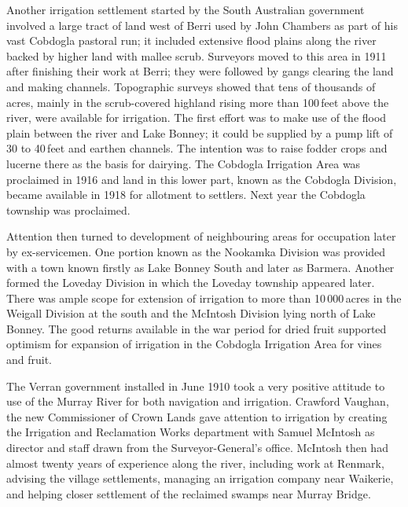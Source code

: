 Another irrigation settlement started by the South Australian
government involved a large tract of land west of Berri used by John
Chambers  as part of his vast Cobdogla
 pastoral run; it included extensive flood plains
along the river backed by higher land with mallee scrub.  Surveyors
moved to this area in 1911 after finishing their work at Berri; they
were followed by gangs clearing the land and making channels.
Topographic surveys showed that tens of thousands of acres, mainly in
the scrub-covered highland rising more than 100\,feet above the river,
were available for irrigation.  The first effort was to make use of
the flood plain between the river and Lake Bonney; it could be
supplied by a pump lift of 30 to 40\,feet and earthen channels. The
intention was to raise fodder crops and lucerne there as the basis for
dairying.  The Cobdogla Irrigation Area
 was proclaimed in 1916 and land in
this lower part, known as the Cobdogla Division, became available in
1918 for allotment to settlers. Next year the Cobdogla township was
proclaimed.

Attention then turned to development of neighbouring areas for
occupation later by ex-servicemen.  One portion known as the Nookamka
Division was provided with a town known firstly as Lake Bonney South
and later as Barmera.  Another formed the Loveday
Division in which the Loveday township appeared later.  There was
ample scope for extension of irrigation to more than 10\,000\,acres in
the Weigall Division at the south and the McIntosh Division lying
north of Lake Bonney.   The good returns available
in the war period for dried fruit supported optimism for expansion of
irrigation in the Cobdogla Irrigation Area for vines and fruit.

The Verran government installed in June 1910 took a very positive
attitude to use of the Murray River for both navigation and
irrigation.  Crawford Vaughan,   the new
Commissioner of Crown Lands gave attention to irrigation by creating
the Irrigation and Reclamation Works department with Samuel McIntosh
as director and staff drawn from the Surveyor-General's office.
McIntosh  then had almost twenty years of
experience along the river, including work at Renmark, advising the
village settlements, managing an irrigation company near Waikerie,
 and
helping closer settlement of the reclaimed swamps near Murray
Bridge.

